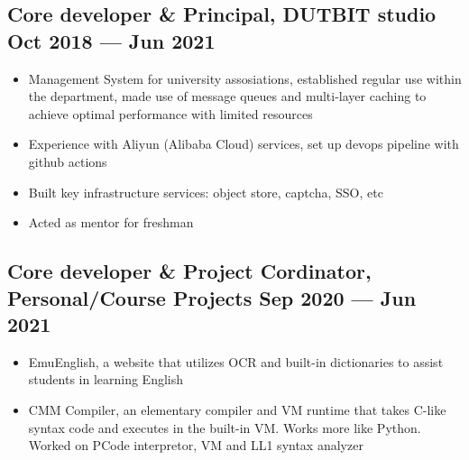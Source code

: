 \documentclass[a4,10pt]{article}
\newenvironment{zitemize}{
\begin{itemize}\itemsep0pt \parskip0pt \parsep1pt}
{\end{itemize}\vspace{-0.5cm}}
\begin{document}


\subsection*{Core developer \& Principal, {\normalsize\normalfont DUTBIT studio} \hfill  Oct 2018 --- Jun 2021} 
    \begin{zitemize}
        \item Management System for university assosiations, established regular use within the department, made use of message queues and multi-layer caching to achieve optimal performance with limited resources
        \item Experience with Aliyun (Alibaba Cloud) services, set up devops pipeline with github actions
        \item Built key infrastructure services: object store, captcha, SSO, etc
        \item Acted as mentor for freshman
    \end{zitemize}


\subsection*{Core developer \& Project Cordinator, {\normalsize\normalfont Personal/Course Projects} \hfill Sep 2020 --- Jun 2021} 
    \begin{zitemize}
        \item EmuEnglish, a website that utilizes OCR and built-in dictionaries to assist students in learning English
        \item CMM Compiler, an elementary compiler and VM runtime that takes C-like syntax code and executes in the built-in VM. Works more like Python. Worked on PCode interpretor, VM and LL1 syntax analyzer
    \end{zitemize}
\end{document}
